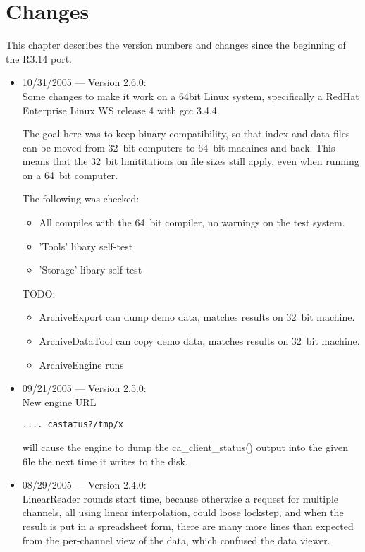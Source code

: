 \chapter{Changes}

This chapter describes the version numbers and changes since
the beginning of the R3.14 port.

\begin{itemize}

\item 10/31/2005 --- Version 2.6.0:\\
Some changes to make it work on a 64bit Linux system,
specifically a RedHat Enterprise Linux WS release 4
with gcc 3.4.4.

The goal here was to keep binary compatibility,
so that index and data files can be moved from
32~bit computers to 64~bit machines and back.
This means that the 32~bit limititations on
file sizes still apply, even when running
on a 64~bit computer.

The following was checked:
\begin{itemize}
\item All compiles with the 64~bit compiler, no warnings on the test system.
\item 'Tools' libary self-test
\item 'Storage' libary self-test
\end{itemize}

TODO:
\begin{itemize}
\item ArchiveExport can dump demo data,
      matches results on 32~bit machine.
\item ArchiveDataTool can copy demo data,
      matches results on 32~bit machine.
\item ArchiveEngine runs
\end{itemize}

\item 09/21/2005 --- Version 2.5.0:\\
New engine URL
\begin{verbatim}
.... castatus?/tmp/x
\end{verbatim}
will cause the engine to dump the ca\_client\_status() output
into the given file the next time it writes to the disk.

\item 08/29/2005 --- Version 2.4.0:\\
LinearReader rounds start time,
because otherwise a request for multiple channels,
all using linear interpolation, could loose
lockstep, and when the result is put in a spreadsheet
form, there are many more lines than expected
from the per-channel view of the data,
which confused the data viewer.


\end{itemize}
